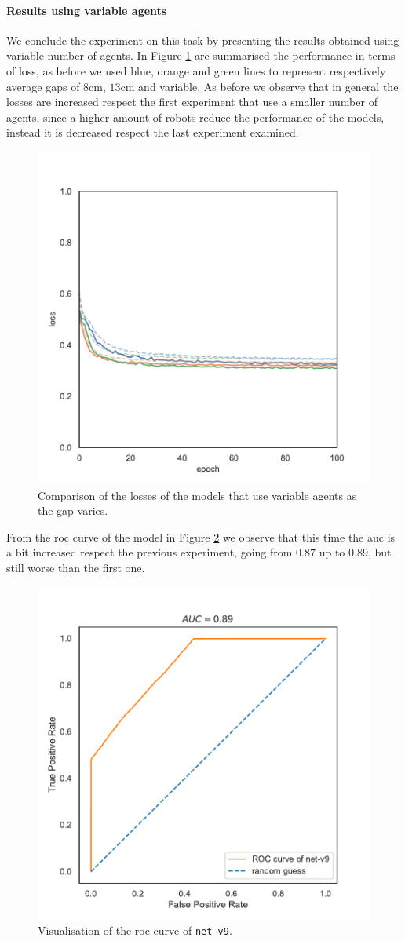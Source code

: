 \paragraph*{Results using variable agents}
We conclude the experiment on this task by presenting the results obtained using 
variable number of agents. In Figure \ref{fig:commlossnvart2} are summarised the 
performance in terms of loss, as before we used blue, orange and green lines to 
represent respectively average gaps of $8$\gls{cm}, $13$\gls{cm} and variable. 
As before we observe that in general the losses are increased respect the first 
experiment that use a smaller number of agents, since a higher amount of robots 
reduce the performance of the models, instead it is decreased respect the last 
experiment examined.
\begin{figure}[!htb]
	\centering
	\includegraphics[width=.47\textwidth]{contents/images/task2/loss-communication-Nvar}
	\caption[Comparison of the losses of the models that use variable 
	agents.]{Comparison of the losses of the models that use variable agents 
	as the gap varies.}
	\label{fig:commlossnvart2}
\end{figure}

From the \gls{roc} curve of the model in Figure \ref{fig:net-v9auc}  we observe 
that this time the \gls{auc} is a bit increased respect the previous experiment, 
going from $0.87$ up to $0.89$, but still worse than the first one.
\begin{figure}[!htb]
	\centering
	\includegraphics[width=.47\textwidth]{contents/images/net-v9/roc-net-v9(a)}%
	\caption[Evaluation of the \gls{roc} of \texttt{net-v9}.]{Visualisation of the 
		\gls{roc} curve of \texttt{net-v9}.}
	\label{fig:net-v9auc}
\end{figure}

